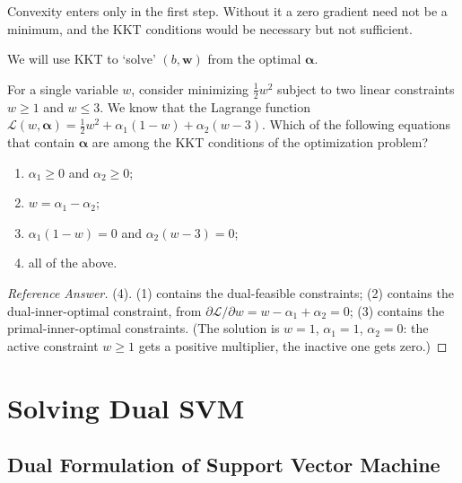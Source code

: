 Convexity enters only in the first step. Without it a zero gradient need
not be a minimum, and the KKT conditions would be necessary but not
sufficient.

\begin{moral}
    We will use KKT to `solve' \((b, \bm{w})\) from the optimal
    \(\bm{\alpha}\).
\end{moral}

\begin{exercise}
    For a single variable \(w\), consider minimizing \(\frac{1}{2} w^2\)
    subject to two linear constraints \(w \ge 1\) and \(w \le 3\). We know
    that the Lagrange function \(\mathcal{L}(w, \bm{\alpha}) = \frac{1}{2}
    w^2 + \alpha_1 (1 - w) + \alpha_2 (w - 3)\). Which of the following
    equations that contain \(\bm{\alpha}\) are among the KKT conditions of
    the optimization problem?
    \begin{enumerate}[(1)]
        \item \(\alpha_1 \ge 0\) and \(\alpha_2 \ge 0\);
        \item \(w = \alpha_1 - \alpha_2\);
        \item \(\alpha_1 (1 - w) = 0\) and \(\alpha_2 (w - 3) = 0\);
        \item all of the above.
    \end{enumerate}
\end{exercise}

\begin{proof}[Reference Answer]
    (4). (1) contains the dual-feasible constraints; (2) contains the
    dual-inner-optimal constraint, from \(\partial \mathcal{L} / \partial w
    = w - \alpha_1 + \alpha_2 = 0\); (3) contains the primal-inner-optimal
    constraints. (The solution is \(w = 1\), \(\alpha_1 = 1\), \(\alpha_2 =
    0\): the active constraint \(w \ge 1\) gets a positive multiplier, the
    inactive one gets zero.)
\end{proof}

\section{Solving Dual SVM}\label{sec:solving-dual}


\subsection{Dual Formulation of Support Vector Machine}

